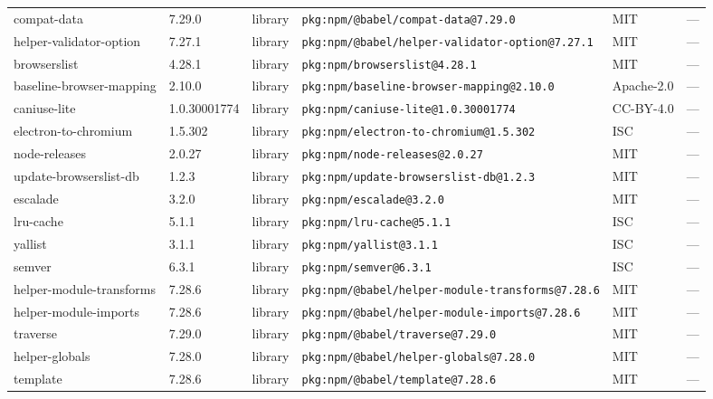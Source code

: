 \documentclass[11pt,a4paper]{article}
\begin{document}
\begin{longtable}{|p{4cm}|p{2cm}|p{1.6cm}|p{5cm}|p{1.5cm}|p{3.5cm}|}
\raggedright compat-data & 7.29.0 & library & \small\texttt{pkg:npm/@babel/compat-data@7.29.0} & MIT & \small — \\
\raggedright helper-validator-option & 7.27.1 & library & \small\texttt{pkg:npm/@babel/helper-validator-option@7.27.1} & MIT & \small — \\
\raggedright browserslist & 4.28.1 & library & \small\texttt{pkg:npm/browserslist@4.28.1} & MIT & \small — \\
\raggedright baseline-browser-mapping & 2.10.0 & library & \small\texttt{pkg:npm/baseline-browser-mapping@2.10.0} & Apache-2.0 & \small — \\
\raggedright caniuse-lite & 1.0.30001774 & library & \small\texttt{pkg:npm/caniuse-lite@1.0.30001774} & CC-BY-4.0 & \small — \\
\raggedright electron-to-chromium & 1.5.302 & library & \small\texttt{pkg:npm/electron-to-chromium@1.5.302} & ISC & \small — \\
\raggedright node-releases & 2.0.27 & library & \small\texttt{pkg:npm/node-releases@2.0.27} & MIT & \small — \\
\raggedright update-browserslist-db & 1.2.3 & library & \small\texttt{pkg:npm/update-browserslist-db@1.2.3} & MIT & \small — \\
\raggedright escalade & 3.2.0 & library & \small\texttt{pkg:npm/escalade@3.2.0} & MIT & \small — \\
\raggedright lru-cache & 5.1.1 & library & \small\texttt{pkg:npm/lru-cache@5.1.1} & ISC & \small — \\
\raggedright yallist & 3.1.1 & library & \small\texttt{pkg:npm/yallist@3.1.1} & ISC & \small — \\
\raggedright semver & 6.3.1 & library & \small\texttt{pkg:npm/semver@6.3.1} & ISC & \small — \\
\raggedright helper-module-transforms & 7.28.6 & library & \small\texttt{pkg:npm/@babel/helper-module-transforms@7.28.6} & MIT & \small — \\
\raggedright helper-module-imports & 7.28.6 & library & \small\texttt{pkg:npm/@babel/helper-module-imports@7.28.6} & MIT & \small — \\
\raggedright traverse & 7.29.0 & library & \small\texttt{pkg:npm/@babel/traverse@7.29.0} & MIT & \small — \\
\raggedright helper-globals & 7.28.0 & library & \small\texttt{pkg:npm/@babel/helper-globals@7.28.0} & MIT & \small — \\
\raggedright template & 7.28.6 & library & \small\texttt{pkg:npm/@babel/template@7.28.6} & MIT & \small — \\

\end{longtable}
\end{document}
